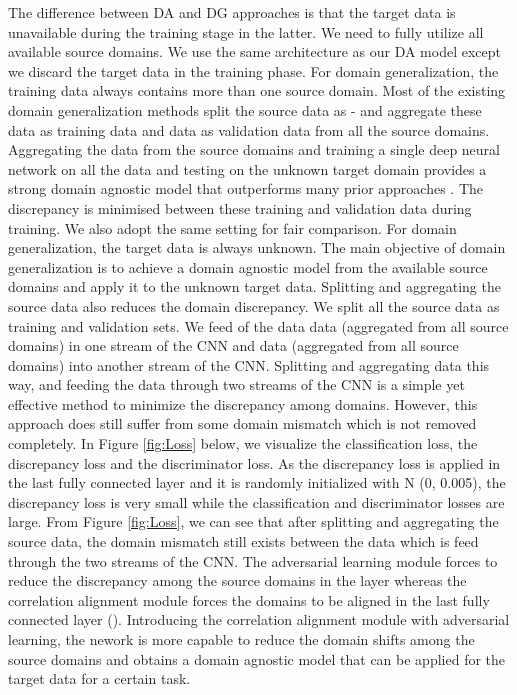 \documentclass[review]{elsarticle}
\begin{document}
The difference between DA and DG approaches is that the target data is unavailable during the training stage in the latter. We need to fully utilize all available source domains. We use the same architecture as our DA model except we discard the target data in the training phase. For domain generalization, the training data always contains more than one source domain. Most of the existing domain generalization methods \cite{8658643,DBLP:conf/iccv/GhifaryKZB15,8053784,Li2018eccv} split the source data as  -  and aggregate these  data as training data and  data as validation data from all the source domains. Aggregating the data from the source domains and training a single deep neural network on all the data and testing on the unknown target domain provides a strong domain agnostic model that outperforms many prior approaches \cite{li2019episodic}. The discrepancy is minimised between these training and validation data during training. We also adopt the same setting for fair comparison. For domain generalization, the target data is always unknown. The main objective of domain generalization is to achieve a domain agnostic model from the available source domains and apply it to the unknown target data. Splitting and aggregating the source data also reduces the domain discrepancy. We split all the source data  as training and validation sets. We feed  of the data data (aggregated from all source domains) in one stream of the CNN and  data (aggregated from all source domains) into another stream of the CNN. Splitting and aggregating data this way, and feeding the data through two streams of the CNN is a simple yet effective method to minimize the discrepancy among domains. However, this approach does still suffer from some domain mismatch which is not removed completely. In Figure \ref{fig:Loss} below, we visualize the classification loss, the discrepancy loss and the discriminator loss. As the discrepancy loss is applied in the last fully connected layer and it is randomly initialized with N (0, 0.005), the discrepancy loss is very small while the classification and discriminator losses are large. From Figure \ref{fig:Loss}, we can see that after splitting and aggregating the source data, the domain mismatch still exists between the data which is feed through the two streams of the CNN. The adversarial learning module forces to reduce the discrepancy among the source domains in the  layer whereas the correlation alignment module forces the domains to be aligned in the last fully connected layer (). Introducing the correlation alignment module with adversarial learning, the nework is more capable to reduce the domain shifts among the source domains and obtains a domain agnostic model that can be applied for the target data for a certain task. 
\end{document}

